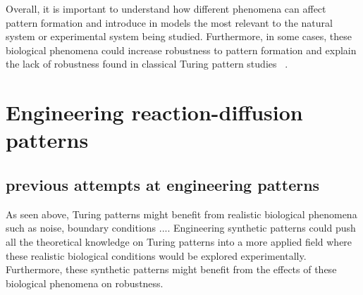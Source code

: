 Overall, it is important to understand how different phenomena can affect pattern formation and introduce in models the most relevant to the natural system or experimental system being studied.
Furthermore, in some cases, these biological phenomena could increase robustness to pattern formation and explain the lack of robustness found in classical Turing pattern studies ~\parencite{Scholes2019}.
%



\section{ Engineering reaction-diffusion patterns}
\subsection{previous attempts at engineering patterns}
As seen above, Turing patterns might benefit from realistic biological phenomena such as noise, boundary conditions ....
Engineering synthetic patterns could push all the theoretical knowledge on Turing patterns into a more applied field where these realistic biological conditions would be explored experimentally.
Furthermore, these synthetic patterns might benefit from the effects of these biological phenomena on robustness.

